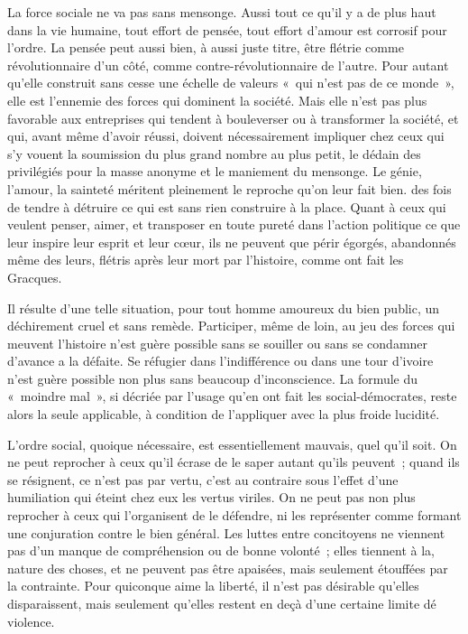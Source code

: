 \documentclass[french,twoside]{book} %
\begin{document}
La force sociale ne va pas sans mensonge. Aussi tout ce qu'il y a de plus haut dans la vie humaine, tout effort de pensée, tout effort d'amour est corrosif pour l'ordre. La pensée peut aussi bien, à aussi juste titre, être flétrie comme révolutionnaire d'un côté, comme contre-révolutionnaire de l'autre. Pour autant qu'elle construit sans cesse une échelle de valeurs « qui n'est pas de ce monde », elle est l'ennemie des forces qui dominent la société. Mais elle n'est pas plus favorable aux entreprises qui tendent à bouleverser ou à transformer la société, et qui, avant même d'avoir réussi, doivent nécessairement impliquer chez ceux qui s'y vouent la soumission du plus grand nombre au plus petit, le dédain des privilégiés pour la masse anonyme et le maniement du mensonge. Le génie, l'amour, la sainteté méritent pleinement le reproche qu'on leur fait bien. des fois de tendre à détruire ce qui est sans rien construire à la place. Quant à ceux qui veulent penser, aimer, et transposer en toute pureté dans l'action politique ce que leur inspire leur esprit et leur cœur, ils ne peuvent que périr égorgés, abandonnés même des leurs, flétris après leur mort par l'histoire, comme ont fait les Gracques.\par
Il résulte d'une telle situation, pour tout homme amoureux du bien public, un déchirement cruel et sans remède. Participer, même de loin, au jeu des forces qui meuvent l'histoire n'est guère possible sans se souiller ou sans se condamner d'avance a la défaite. Se réfugier dans l'indifférence ou dans une tour d'ivoire n'est guère possible non plus sans beaucoup d'inconscience. La formule du « moindre mal », si décriée par l'usage qu’en ont fait les social-démocrates, reste alors la seule applicable, à condition de l'appliquer avec la plus froide lucidité.\par
L'ordre social, quoique nécessaire, est essentiellement mauvais, quel qu'il soit. On ne peut reprocher à ceux qu'il écrase de le saper autant qu'ils peuvent ; quand ils se résignent, ce n'est pas par vertu, c'est au contraire sous l'effet d'une humiliation qui éteint chez eux les vertus viriles. On ne peut pas non plus reprocher à ceux qui l'organisent de le défendre, ni les représenter comme formant une conjuration contre le bien général. Les luttes entre concitoyens ne viennent pas d'un manque de compréhension ou de bonne volonté ; elles tiennent à la, nature des choses, et ne peuvent pas être apaisées, mais seulement étouffées par la contrainte. Pour quiconque aime la liberté, il n'est pas désirable qu'elles disparaissent, mais seulement qu'elles restent en deçà d'une certaine limite dé violence.\par
\end{document}
